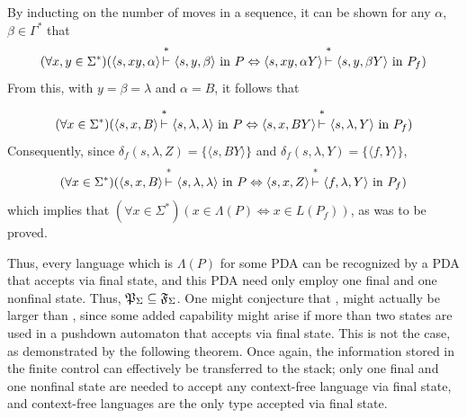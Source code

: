 \begin{thm}
By inducting on the number of moves in a sequence, it can be shown for any
$\alpha$, $\beta\in\Gamma^*$ that
\[ (\forall x,y\in\Sigma^*)(\langle s,xy,\alpha\rangle\Dvdash \langle s,y,\beta\rangle
	\text{ in }P \Leftrightarrow \langle s,xy,\alpha Y\rangle \Dvdash \langle s,y,\beta Y\rangle
	\text{ in }P_{  f}) \]
From this, with $y = \beta = \lambda$ and $\alpha = B$, it follows that

\[ (\forall x\in\Sigma^*)(\langle s,x,B\rangle\Dvdash\langle s,\lambda,\lambda\rangle
	\text{ in }P\Leftrightarrow\langle s,x,BY\rangle\Dvdash\langle s,\lambda,Y\rangle\text{ in }P_{  f})\]
Consequently, since $\delta_{  f}(s,\lambda,Z)=\{\langle s,BY\rangle\}$ and
$\delta_{  f}(s,\lambda,Y)=\{\langle f,Y\rangle\}$,
\[ (\forall x\in\Sigma^*)(\langle s,x,B\rangle\Dvdash \langle s,\lambda,\lambda\rangle\text{ in }P
	\Leftrightarrow\langle s,x,Z\rangle\Dvdash\langle f,\lambda,Y\rangle\text{ in }P_{  f})\]
which implies that $(\forall x\in\Sigma^*)(x\in\Lambda(P)\Leftrightarrow x\in
L(P_{  f}))$, as was to be proved.
\end{thm}

Thus, every language which is $\Lambda(P)$ for some PDA can be recognized by a
PDA that accepts via final state, and this PDA need only employ one final and
one nonfinal state. Thus, $\mathfrak{P}_\Sigma\subseteq\mathfrak{F}_\Sigma$. One might conjecture that
\FSIG, might actually be larger than \PSIG, since some added capability might
arise if more than two states are used in a pushdown automaton that accepts via
final state. This is not the case, as demonstrated by the following theorem.
Once again, the information stored in the finite control can effectively be
transferred to the stack; only one final and one nonfinal state are needed to
accept any context-free language via final state, and context-free languages are
the only type accepted via final state.

